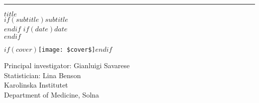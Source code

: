 
\rule{\textwidth}{1pt} %
\vspace{0.1\textheight} %

\centering %

{\huge\bfseries\nohyphens{$title$}}\\[2\baselineskip] 
$if(subtitle)${\large\textit{$subtitle$}}\\[2\baselineskip]$endif$
$if(date)${\large\textit{$date$}}\\[4\baselineskip]$endif$

$if(cover)$\texttt{[image: \$cover\$]}$endif$


\vfill

Principal investigator: Gianluigi Savarese\\
Statistician: Lina Benson\\
Karolinska Institutet\\
Department of Medicine, Solna